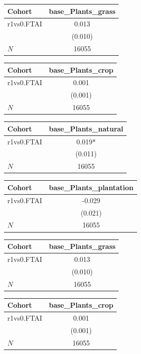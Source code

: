 {
\def\sym#1{\ifmmode^{#1}\else\(^{#1}\)\fi}
\begin{tabular}{l*{1}{c}}
\toprule
Cohort    &base\_Plants\_grass   \\
\midrule
r1vs0.FTAI&    0.013   \\
          &  (0.010)   \\
\midrule
\(N\)     &    16055   \\
\bottomrule
\end{tabular}
}
{
\def\sym#1{\ifmmode^{#1}\else\(^{#1}\)\fi}
\begin{tabular}{l*{1}{c}}
\toprule
Cohort    &base\_Plants\_crop   \\
\midrule
r1vs0.FTAI&    0.001   \\
          &  (0.001)   \\
\midrule
\(N\)     &    16055   \\
\bottomrule
\end{tabular}
}
{
\def\sym#1{\ifmmode^{#1}\else\(^{#1}\)\fi}
\begin{tabular}{l*{1}{c}}
\toprule
Cohort    &base\_Plants\_natural   \\
\midrule
r1vs0.FTAI&    0.019*  \\
          &  (0.011)   \\
\midrule
\(N\)     &    16055   \\
\bottomrule
\end{tabular}
}
{
\def\sym#1{\ifmmode^{#1}\else\(^{#1}\)\fi}
\begin{tabular}{l*{1}{c}}
\toprule
Cohort    &base\_Plants\_plantation   \\
\midrule
r1vs0.FTAI&   -0.029   \\
          &  (0.021)   \\
\midrule
\(N\)     &    16055   \\
\bottomrule
\end{tabular}
}
{
\def\sym#1{\ifmmode^{#1}\else\(^{#1}\)\fi}
\begin{tabular}{l*{1}{c}}
\toprule
Cohort    &base\_Plants\_grass   \\
\midrule
r1vs0.FTAI&    0.013   \\
          &  (0.010)   \\
\midrule
\(N\)     &    16055   \\
\bottomrule
\end{tabular}
}
{
\def\sym#1{\ifmmode^{#1}\else\(^{#1}\)\fi}
\begin{tabular}{l*{1}{c}}
\toprule
Cohort    &base\_Plants\_crop   \\
\midrule
r1vs0.FTAI&    0.001   \\
          &  (0.001)   \\
\midrule
\(N\)     &    16055   \\
\bottomrule
\end{tabular}
}
